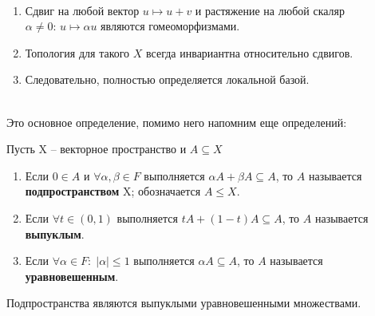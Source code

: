 \documentclass[12pt, a4paper, oneside]{book}
\begin{document}
\begin{remark}\ \\
    \begin{enumerate}
        \item Сдвиг на любой вектор $ u \mapsto u+v$ и растяжение на любой скаляр $\alpha \neq 0: \,u \mapsto \alpha u $ являются гомеоморфизмами.
        \item Топология для такого $X$ всегда инвариантна относительно сдвигов.
        \item Следовательно, полностью определяется локальной базой.

    \end{enumerate}
\end{remark}
\ \\
Это основное определение, помимо него напомним еще определений:
\begin{definition}
    Пусть X -- векторное пространство и $A \subseteq X$
    \begin{enumerate}
        \item Если $0\in A$ и  $\forall \alpha,\beta \in F$ выполняется $\alpha A + \beta A \subseteq A$, то $A$ называется \textbf{подпространством} X; обозначается $A \leqslant X$.
        \item Если $\forall t \in (0,1)$ выполняется $tA + (1-t)A \subseteq A$, то $A$ называется \textbf{выпуклым}.
        \item Если $\forall \alpha \in F: \; |\alpha| \leqslant 1$ выполняется $\alpha A \subseteq A$, то $A$ называется \textbf{уравновешенным}.
    \end{enumerate}
\end{definition}

\begin{remark}
Подпространства являются выпуклыми уравновешенными множествами.
\end{remark}
\end{document}
